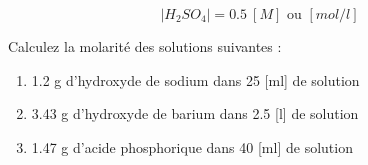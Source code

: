 \documentclass[
  11pt,
  french,
  a4paper,
  openany]{book}
\providecommand{\tightlist}{%
  \setlength{\itemsep}{0pt}\setlength{\parskip}{0pt}}
\begin{document}
\[ |H_2SO_4| = 0.5\ [M] \text{ ou } [mol/l] \]

\begin{Exercise}

Calculez la molarité des solutions suivantes :

\begin{enumerate}
\def\labelenumi{\arabic{enumi}.}
\tightlist
\item
  1.2 g d'hydroxyde de sodium dans 25 {[}ml{]} de solution
\item
  3.43 g d'hydroxyde de barium dans 2.5 {[}l{]} de solution
\item
  1.47 g d'acide phosphorique dans 40 {[}ml{]} de solution
\end{enumerate}


\end{Exercise}
\end{document}
